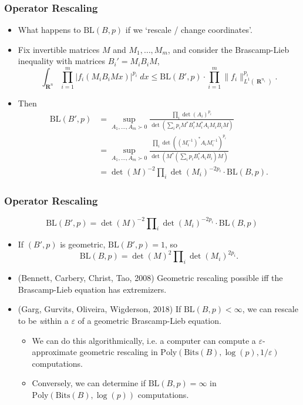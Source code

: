 \documentclass[usenames,dvipsnames,12pt]{beamer}
\DeclareMathOperator{\RR}{\mathbf{R}}
\begin{document}
\begin{frame}
    \frametitle{Operator Rescaling}

    \begin{itemize}
        \item What happens to $\text{BL}(B,p)$ if we `rescale / change coordinates'.

        \pause
        \item Fix invertible matrices $M$ and $M_1, \dots, M_m$, and consider the Brascamp-Lieb inequality with matrices $B_i' = M_i B_i M$,
        \[ \int_{\RR^n} \prod_{i = 1}^m |f_i(M_i B_i M x)|^{p_i}\; dx \leq \text{BL}(B',p) \cdot \prod_{i = 1}^m \| f_i \|_{L^1(\RR^{n_i})}^{p_i}. \]
        \pause
        \item Then
        \begin{align*}
            \text{BL}(B',p) &= \sup_{A_1,\dots,A_m \succ 0} \frac{\prod_i \det(A_i)^{p_i}}{\det(\sum_i p_i M^* B_i^* M_i^* A_i M_i B_i M)}\\
            &= \sup_{A_1,\dots,A_m \succ 0} \frac{\prod_i \det((M_i^{-1})^* A_i M_i^{-1})^{p_i}}{\det(M^* (\sum_i p_i B_i^* A_i B_i) M)}\\
            &= \det(M)^{-2} \prod_i \det(M_i)^{-2p_i} \cdot \text{BL}(B,p). 
        \end{align*}
    \end{itemize}
\end{frame}

\begin{frame}
    \frametitle{Operator Rescaling}

    \[ \text{BL}(B',p) = \det(M)^{-2} \prod\nolimits_i \det(M_i)^{-2p_i} \cdot \text{BL}(B,p) \]

    \begin{itemize}
        \pause
        \item If $(B',p)$ is geometric, $\text{BL}(B',p) = 1$, so
        \[ \text{BL}(B,p) = \det(M)^2 \prod\nolimits_i \det(M_i)^{2p_i}. \]

        \pause
        \item (Bennett, Carbery, Christ, Tao, 2008) Geometric rescaling possible iff the Brascamp-Lieb equation has extremizers.

        \pause
        \item (Garg, Gurvits, Oliveira, Wigderson, 2018) If $\text{BL}(B,p) < \infty$, we can rescale to be {\emph within a $\varepsilon$} of a geometric Brascamp-Lieb equation.
        \begin{itemize}
            \pause
            \item We can do this algorithmically, i.e. a computer can compute a $\varepsilon$-approximate geometric rescaling in $\text{Poly}(\text{Bits}(B),\log(p),1/\varepsilon)$ computations. 

            \pause
            \item
            Conversely, we can determine if $\text{BL}(B,p) = \infty$ in $\text{Poly}(\text{Bits}(B),\log(p))$ computations.
        \end{itemize}
    \end{itemize}
\end{frame}
\end{document}
